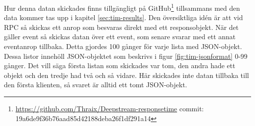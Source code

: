 Hur denna datan skickades finns tillgängligt på GitHub\footnote{\url{https://github.com/Thraix/Deepstream-responsetime} \newline commit: 19a6de9f36b76aad85d42188deba26f1df291a14 } tillsammans med den data kommer tas upp i kapitel \ref{sec:tim-results}. Den översiktliga idén är att vid RPC så skickas ett anrop som besvaras direkt med ett responsobjekt. När det gäller event så skickas datan över ett event, som senare svarar med ett annat eventanrop tillbaka. Detta gjordes 100 gånger för varje lista med JSON-objekt. Dessa listor innehöll JSON-objektet som beskrivs i figur \ref{fig:tim-jsonformat} 0-99 gånger. Det vill säga första listan som skickades var tom, den andra hade ett objekt och den tredje had två och så vidare. Här skickades inte datan tillbaka till den första klienten, så svaret är alltid ett tomt JSON-objekt. 
